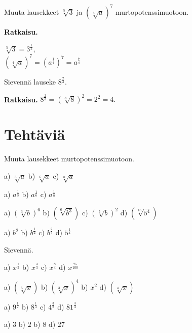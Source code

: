 \begin{esimerkki}
Muuta lausekkeet $\sqrt[5]{3}$ ja $(\sqrt[4]{a})^7$ murtopotenssimuotoon.

{\bf Ratkaisu.}

$\sqrt[5]{3} = 3^\frac{1}{5}$, \\
$(\sqrt[4]{a})^7 = (a^\frac{1}{4})^7=a^\frac{7}{4}$
\end{esimerkki}

\begin{esimerkki}
Sievennä lauseke $8^\frac{2}{3}$.

{\bf Ratkaisu.}
 $8^\frac{2}{3} = (\sqrt[3]{8})^2 = 2^2 = 4.$
\end{esimerkki}

\section*{Tehtäviä}

Muuta lausekkeet murtopotenssimuotoon.

\begin{tehtava}
a) $\sqrt[3]{a}$ \qquad
b) $\sqrt[6]{a}$ \qquad
c) $\sqrt[n]{a}$ 
\begin{vastaus}	
a) $a^\frac{1}{3}$ \qquad
b) $a^\frac{1}{6}$ \qquad
c) $a^\frac{1}{n}$ \qquad
\end{vastaus}
\end{tehtava}

\begin{tehtava}
a) $(\sqrt[3]{b})^6$ \qquad
b) $(\sqrt[6]{b^3})$ \qquad
c) $(\sqrt[5]{b})^2$ \qquad
d) $(\sqrt[16]{ö^4})$
\begin{vastaus}	
a) $b^2$ \qquad
b) $b^\frac{1}{2}$ \qquad
c) $b^\frac{2}{5}$ \qquad
d) $ö^\frac{1}{4}$
\end{vastaus}
\end{tehtava}

Sievennä.
\begin{tehtava}
a) $x^\frac{1}{5}$ \qquad
b) $x^\frac{4}{3}$ \qquad
c) $x^\frac{8}{4}$ \qquad
d) $x^\frac{25}{100}$ \qquad
\begin{vastaus}	
a) $(\sqrt[5]{x})$ \qquad
b) $(\sqrt[3]{x})^4$ \qquad
b) $x^2$ \qquad
d) $(\sqrt[4]{x})$ 
\end{vastaus}
\end{tehtava}

\begin{tehtava}
a) $9^\frac{1}{2}$ \qquad
b) $8^\frac{1}{3}$ \qquad
c) $4^\frac{3}{2}$ \qquad
d) $81^\frac{3}{4}$ \qquad
\begin{vastaus}	
a) $3$ \qquad
b) $2$ \qquad
b) $8$ \qquad
d) $27$ 
\end{vastaus}
\end{tehtava}

